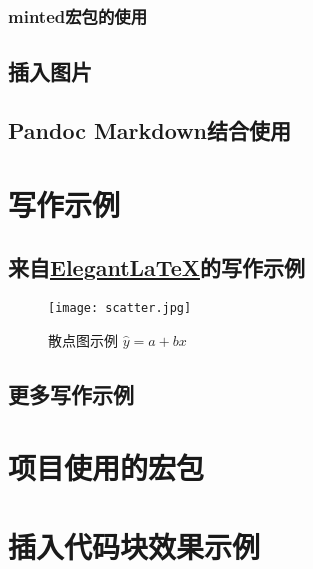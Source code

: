 \documentclass[12pt, green, textbook]{uglyrep}
\begin{document}
\subsection{minted宏包的使用}


\section{插入图片}


\section{Pandoc Markdown结合使用}



\chapter{写作示例}

\section{来自\href{https://github.com/ElegantLaTeX/}{Elegant\LaTeX}的写作示例}


\begin{figure}[htbp]
  \centering
  \texttt{[image: scatter.jpg]}
  \caption{散点图示例 $\hat{y}=a+bx$ \label{fig:scatter}}
\end{figure}

\section{更多写作示例}


\printbibliography[
  title=\ebibname
]

\clearpage
\appendix
\appendixpage
\addappheadtotoc

\chapter{项目使用的宏包}


\chapter{插入代码块效果示例}

\end{document}
